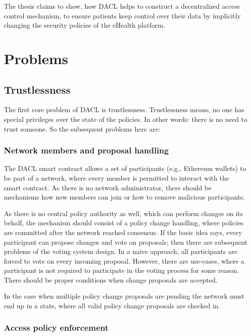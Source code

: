 \documentclass[12pt, conference]{IEEEtran}
\begin{document}
The thesis claims to show, how DACL helps to construct a decentralized access control mechanism, to ensure patients keep control over their data by implicitly changing the security policies of the eHealth platform.

\section{Problems}



\subsection{Trustlessness}

The first core problem of DACL is trustlessness. Trustlessness means, no one has special privileges over the state of the policies.  In other words: there is no need to trust someone. So the subsequent problems here are: \\

\subsubsection{Network members and proposal handling}

The DACL smart contract allows a set of participants (e.g., Ethereum wallets) to be part of a network, where every member is permitted to interact with the smart contract. As there is no network administrator, there should be mechanisms how new members can join or how to remove malicious participants. 

As there is no central policy authority as well, which can perform changes on its behalf, the mechanism should consist of a policy change handling, where policies are committed after the network reached consensus. If the basic idea says, every participant can propose changes and vote on proposals; then there are subsequent problems of the voting system design. In a naive approach, all participants are forced to vote on every incoming proposal. However, there are use-cases, where a participant is not required to participate in the voting process for some reason. There should be proper conditions when change proposals are accepted.

In the case when multiple policy change proposals are pending the network must end up in a state, where all valid policy change proposals are checked in.

\subsubsection{Access policy enforcement}
\end{document}
